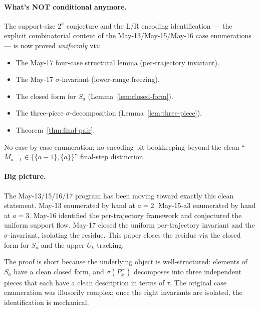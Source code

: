 \documentclass[11pt]{article}
\theoremstyle{definition}
\begin{document}
\paragraph{What's NOT conditional anymore.}  The support-size $2^a$
conjecture and the L/R encoding identification — the explicit
combinatorial content of the May-13/May-15/May-16 case enumerations
— is now proved \emph{uniformly} via:
\begin{itemize}[leftmargin=2em,topsep=0.3em,itemsep=0.2em]
\item The May-17 four-case structural lemma (per-trajectory invariant).
\item The May-17 $\sigma$-invariant (lower-range freezing).
\item The closed form for $S_a$ (Lemma~\ref{lem:closed-form}).
\item The three-piece $\sigma$-decomposition (Lemma~\ref{lem:three-piece}).
\item Theorem~\ref{thm:final-pair}.
\end{itemize}
No case-by-case enumeration; no encoding-bit bookkeeping beyond the
clean ``$\bar M_{a-1}\in\{\{a-1\},\{a\}\}$'' final-step distinction.

\paragraph{Big picture.}  The May-13/15/16/17 program has been
moving toward exactly this clean statement.  May-13 enumerated by
hand at $a=2$.  May-15-a3 enumerated by hand at $a=3$.  May-16
identified the per-trajectory framework and conjectured the uniform
support flow.  May-17 closed the uniform per-trajectory invariant
and the $\sigma$-invariant, isolating the residue.  This paper
closes the residue via the closed form for $S_a$ and the upper-$U_k$
tracking.

The proof is short because the underlying object is well-structured:
elements of $S_a$ have a clean closed form, and $\sigma(P_k^+)$
decomposes into three independent pieces that each have a clean
description in terms of $\tau$.  The original case enumeration was
illusorily complex; once the right invariants are isolated, the
identification is mechanical.
\end{document}
